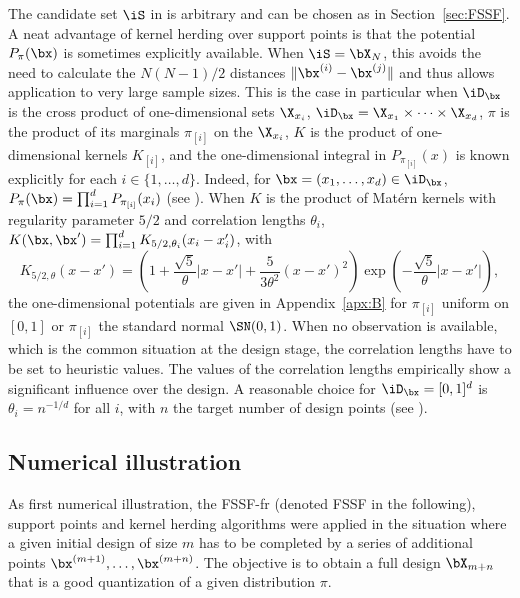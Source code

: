 The candidate set $\iS$ in  is arbitrary and can be chosen as in Section~\ref{sec:FSSF}. 
A neat advantage of kernel herding over support points is that the potential $P_{\pi}(\bx)$ is sometimes explicitly available. 
When $\iS=\bX_N$, this avoids the need to calculate the $N(N-1)/2$ distances $\|\bx^{(i)}-\bx^{(j)}\|$ and thus allows application to very large sample sizes. 
This is the case in particular when $\iD_\bx$ is the cross product of one-dimensional sets $\X_{x_i}$, $\iD_\bx=\X_{x_1}\times\cdots\times\X_{x_d}$, $\pi$ is the product of 
its marginals
$\pi_{[i]}$ on the $\X_{x_i}$, $K$ is the product of one-dimensional kernels $K_{[i]}$, and the one-dimensional integral in $P_{\pi_{[i]}}(x)$ is known explicitly for each $i\in\{1,\ldots,d\}$. 
Indeed, for $\bx=(x_1,\ldots,x_d)\in\iD_\bx$, $P_{\pi}(\bx)=\prod_{i=1}^d P_{\pi_{[i]}}(x_i)$ (see \citealp{pronzato_zhigljavsky_2020}). 
When $K$ is the product of Mat\'ern kernels with regularity parameter $5/2$ and correlation lengths $\theta_i$, $K(\bx,\bx') = \prod_{i=1}^{d} K_{5/2,\theta_{i}}(x_{i}-x'_i)$, with
\begin{equation}\label{eq:Matern5/2}
K_{5/2,\theta}(x-x')
=
\left(1 + \frac{\sqrt{5}}{\theta} |x - x'| + \frac{5}{3 \theta^2} (x - x')^2 \right)
\exp \left( - \frac{\sqrt{5}}{\theta} |x - x'| \right),
\end{equation}
the one-dimensional potentials are given in Appendix~\ref{apx:B} for $\pi_{[i]}$ uniform on $[0,1]$ or $\pi_{[i]}$ the standard normal $\SN(0,1)$. 
When no observation is available, which is the common situation at the design stage, the correlation lengths have to be set to heuristic values. 
The values of the correlation lengths empirically show a significant influence over the design. 
A reasonable choice for $\iD_\bx=[0,1]^d$ is $\theta_i = n^{-1/d}$ for all $i$, with $n$ the target number of design points (see \citealp{pronzato_zhigljavsky_2020}). 

\subsection{Numerical illustration}\label{sec:numerical-1}

As first numerical illustration, the FSSF-fr (denoted FSSF in the following), support points and kernel herding algorithms were applied in the situation where a given initial design of size $m$ has to be completed by a series of additional points $\bx^{(m+1)},\ldots,\bx^{(m+n)}$. 
The objective is to obtain a full design $\bX_{m+n}$ that is a good quantization of a given distribution $\pi$. 

